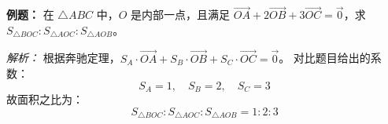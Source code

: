 \begin{examplebox}
\textbf{例题：} 在 $\triangle ABC$ 中，$O$ 是内部一点，且满足 $\vec{OA} + 2\vec{OB} + 3\vec{OC} = \vec{0}$，求 $S_{\triangle BOC} : S_{\triangle AOC} : S_{\triangle AOB}$。

\textit{解析：} 
根据奔驰定理，$S_A \cdot \vec{OA} + S_B \cdot \vec{OB} + S_C \cdot \vec{OC} = \vec{0}$。
对比题目给出的系数：
\[ S_A = 1, \quad S_B = 2, \quad S_C = 3 \]
故面积之比为：
\[ S_{\triangle BOC} : S_{\triangle AOC} : S_{\triangle AOB} = 1 : 2 : 3 \]



\end{examplebox}

